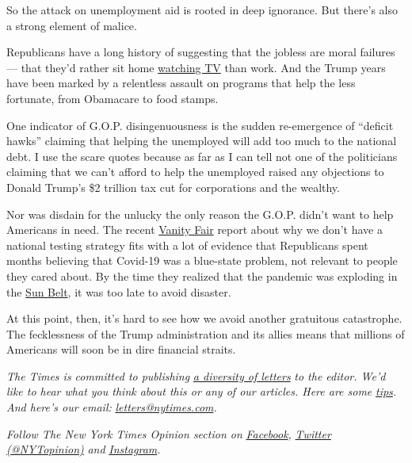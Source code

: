 So the attack on unemployment aid is rooted in deep ignorance. But
there's also a strong element of malice.

Republicans have a long history of suggesting that the jobless are moral
failures --- that they'd rather sit home
\href{https://www.epi.org/blog/ugly-views-about-the-unemployed-by-congressional-republicans/}{watching
TV} than work. And the Trump years have been marked by a relentless
assault on programs that help the less fortunate, from Obamacare to food
stamps.

One indicator of G.O.P. disingenuousness is the sudden re-emergence of
``deficit hawks'' claiming that helping the unemployed will add too much
to the national debt. I use the scare quotes because as far as I can
tell not one of the politicians claiming that we can't afford to help
the unemployed raised any objections to Donald Trump's \$2 trillion tax
cut for corporations and the wealthy.

Nor was disdain for the unlucky the only reason the G.O.P. didn't want
to help Americans in need. The recent
\href{https://www.vanityfair.com/news/2020/07/how-jared-kushners-secret-testing-plan-went-poof-into-thin-air}{Vanity
Fair} report about why we don't have a national testing strategy fits
with a lot of evidence that Republicans spent months believing that
Covid-19 was a blue-state problem, not relevant to people they cared
about. By the time they realized that the pandemic was exploding in the
\href{https://covidtracking.com/data/charts/regional-cases}{Sun Belt},
it was too late to avoid disaster.

At this point, then, it's hard to see how we avoid another gratuitous
catastrophe. The fecklessness of the Trump administration and its allies
means that millions of Americans will soon be in dire financial straits.

\emph{The Times is committed to publishing}
\href{https://www.nytimes.com/2019/01/31/opinion/letters/letters-to-editor-new-york-times-women.html}{\emph{a
diversity of letters}} \emph{to the editor. We'd like to hear what you
think about this or any of our articles. Here are some}
\href{https://help.nytimes.com/hc/en-us/articles/115014925288-How-to-submit-a-letter-to-the-editor}{\emph{tips}}\emph{.
And here's our email:}
\href{mailto:letters@nytimes.com}{\emph{letters@nytimes.com}}\emph{.}

\emph{Follow The New York Times Opinion section on}
\href{https://www.facebook.com/nytopinion}{\emph{Facebook}}\emph{,}
\href{http://twitter.com/NYTOpinion}{\emph{Twitter (@NYTopinion)}}
\emph{and}
\href{https://www.instagram.com/nytopinion/}{\emph{Instagram}}\emph{.}

